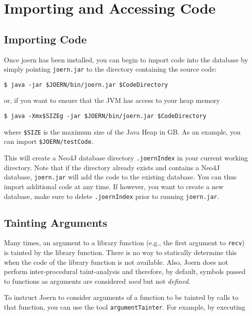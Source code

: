\documentclass[a4paper]{article}
\newcommand{\code}[1]{\texttt{\small #1}}
\begin{document}
\section{Importing and Accessing Code}
\label{sec:importAccess}

\subsection{Importing Code}

Once joern has been installed, you can begin to import code into the
database by simply pointing \code{joern.jar} to the directory
containing the source code:

\begin{verbatim}
$ java -jar $JOERN/bin/joern.jar $CodeDirectory
\end{verbatim} or, if you want to ensure that the JVM has access to
your heap memory
\begin{verbatim}
$ java -Xmx$SIZEg -jar $JOERN/bin/joern.jar $CodeDirectory
\end{verbatim}

where \code{\$SIZE} is the maximum size of the Java Heap in GB. As an
example, you can import \code{\$JOERN/testCode}.

This will create a Neo4J database directory \code{.joernIndex} in your
current working directory. Note that if the directory already exists
and contains a Neo4J database, \code{joern.jar} will add the code to the
existing database. You can thus import additional code at any time. If
however, you want to create a new database, make sure to delete
\code{.joernIndex} prior to running \code{joern.jar}.


\subsection{Tainting Arguments}

Many times, an argument to a library function (e.g., the first
argument to \code{recv}) is tainted by the library function. There is
no way to statically determine this when the code of the library
function is not available. Also, Joern does not perform
inter-procedural taint-analysis and therefore, by default, symbols
passed to functions as arguments are considered \emph{used} but not
\emph{defined}.

To instruct Joern to consider arguments of a function to be tainted by
calls to that function, you can use the tool
\code{argumentTainter}. For example, by executing
\end{document}
